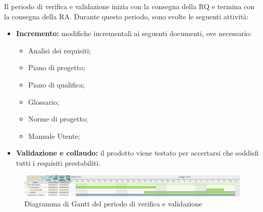 Il periodo di verifica e validazione inizia con la consegna della RQ e termina con la consegna della RA.\newline
Durante questo periodo, sono svolte le seguenti attività:
\begin{itemize}
	\item \textbf{Incremento: }modifiche incrementali ai seguenti documenti, ove necessario:
	\begin{itemize}
		\item Analisi dei requisiti;
		\item Piano di progetto;
		\item Piano di qualifica;
		\item Glossario;
		\item Norme di progetto;
		\item Manuale Utente;
	\end{itemize}
	\item \textbf{Validazione e collaudo: }il prodotto viene testato per accertarsi che soddisfi tutti i requisiti prestabiliti.
\end{itemize}


\begin{figure}[H]
	\includegraphics[width=1\linewidth]{Pianificazione/Verifica_Validazione.png}
	\caption{Diagramma di Gantt del periodo di verifica e validazione}
\end{figure}